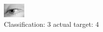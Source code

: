 \begin{figure}[h!]
\begin{center}
\includegraphics[width=0.60\columnwidth]{figures/ID2937_class_3_target_4.png}
\end{center}
\caption{ Classification: 3 actual target: 4}
\label{fig:ID2937_class_3_target_4}
\end{figure}
